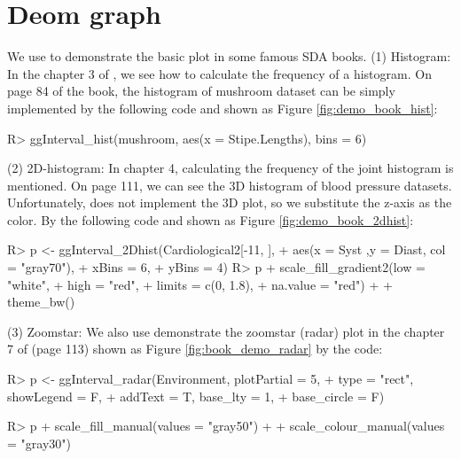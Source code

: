 \documentclass[article]{jss}
\begin{document}
\section*{Deom graph}

We use  to demonstrate the basic plot in some famous SDA books. (1) Histogram: In the chapter 3 of \cite{billard:2006}, we see how to calculate the frequency of a histogram. On page 84 of the book, the histogram of mushroom dataset can be simply implemented by the following code and shown as Figure \ref{fig:demo_book_hist}:
\begin{CodeChunk}
\begin{CodeInput}
R> ggInterval_hist(mushroom, aes(x = Stipe.Lengths), bins = 6)
\end{CodeInput}
\end{CodeChunk}

(2) 2D-histogram: In chapter 4, calculating the frequency of the joint histogram is mentioned. On page 111, we can see the 3D histogram of blood pressure datasets. Unfortunately,  does not implement the 3D plot, so we substitute the z-axis as the color. By the following code and shown as Figure \ref{fig:demo_book_2dhist}:
\begin{CodeChunk}
\begin{CodeInput}
R> p <- ggInterval_2Dhist(Cardiological2[-11, ], 
+                       aes(x = Syst ,y = Diast, col = "gray70"),
+                       xBins = 6,
+                       yBins = 4)
R> p + scale_fill_gradient2(low = "white",
+                         high = "red",
+                         limits = c(0, 1.8),
+                         na.value = "red") +
+      theme_bw()
\end{CodeInput}
\end{CodeChunk}

(3) Zoomstar: We also use  demonstrate the zoomstar (radar) plot in the chapter 7 of \cite{diday:2008} (page 113) shown as Figure \ref{fig:book_demo_radar} by the code:
\begin{CodeChunk}
\begin{CodeInput}
R> p <- ggInterval_radar(Environment, plotPartial = 5,
+                        type = "rect", showLegend = F,
+                        addText = T, base_lty = 1,
+                        base_circle = F)

R> p + scale_fill_manual(values = "gray50") +
+      scale_colour_manual(values = "gray30")

\end{CodeInput}
\end{CodeChunk}
\end{document}
